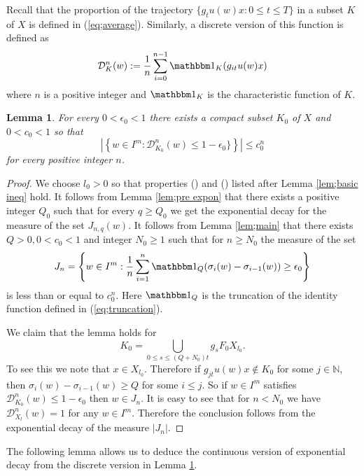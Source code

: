 \documentclass[12pt]{amsart}
\newtheorem{lem}[thm]{Lemma}
\theoremstyle{definition}
\theoremstyle{remark}
\numberwithin{equation}{section}
\begin{document}
Recall that the proportion of the trajectory $\{g_tu(w)x: 0\le t\le T\}$ in a subset $K$ of $X$ 
is defined in (\ref{eq;average}).  Similarly, a discrete version of this function  is 
defined as
\begin{equation}\label{eq;daverage}
\mathcal D_{K}^n(w):= \frac{1}{n}\sum_{i=0}^{n-1} \mathbbm 1_{K}(g_{it}u(w)x)
\end{equation}
where $n$ is a positive integer and $\mathbbm 1_K$ is the characteristic function of $K$.

\begin{lem}\label{lem;discrete}
For every $0<\epsilon_0<1$ 
there exists a compact subset $K_0$ of $X$ and $0<c_0<1$ so that
\begin{equation}\label{eq;gotoUK}
\left| \left\{
w\in I^m:\mathcal D_{K_0}^n(w)\le 1-\epsilon_0\}
\right\}
\right|\le c_0^n
\end{equation}
for every positive integer $n$.
\end{lem}
\begin{proof}
We choose $l_0>0$ so that  properties ({}) and ({}) listed after Lemma \ref{lem;basic ineq} hold.
It follows from Lemma \ref{lem;pre expon} that there exists a positive integer  $Q_0$
such that for every $q\ge Q_0$ we get the exponential decay for the measure of  the set $J_{n, q}(w)$.
It follows from Lemma \ref{lem;main} that there exists $Q>0, 0<c_0<1$ and integer $N_0\ge 1$ such that  for $n\ge N_0$ the measure of the  set 
\[
J_n=\left\{w\in I^m:\frac{1}{n} \sum_{i=1}^n  \mathbbm 1 _Q (\sigma_i(w)-\sigma_{i-1}(w))\ge \epsilon_0
\right \}
\]
is less than or equal to $c_0^n$. Here  $ \mathbbm 1 _Q$ is the truncation of the  identity function    defined in (\ref{eq;truncation}).

We claim that the lemma holds for 
\[ K_0= \bigcup_{0\le s\le (Q+N_0)t}g_sF_0X_{l_0}.
\]  
To see this we  note  that $x\in X_{l_0}$.  Therefore    if $g_{jt}u(w)x\not \in K_0$ for some $j\in \mathbb N $,
 then $\sigma_i(w)-\sigma_{i-1}(w)\ge Q$
for some $i\le  j$.
 So if $w\in I^m$ satisfies  $\mathcal D_{K_0}^n(w)\le 1-\epsilon_0$ then $w\in J_n$.
It is easy to see that for  $n<N_0$ we have $\mathcal D_{X_l}^n(w)=1$ for any $w\in I^m$.
Therefore the conclusion follows from the exponential decay of the measure $|J_n|$.
\end{proof}

The following lemma allows us to deduce the continuous version of exponential decay from 
the discrete version in Lemma \ref{lem;discrete}. 
\end{document}
